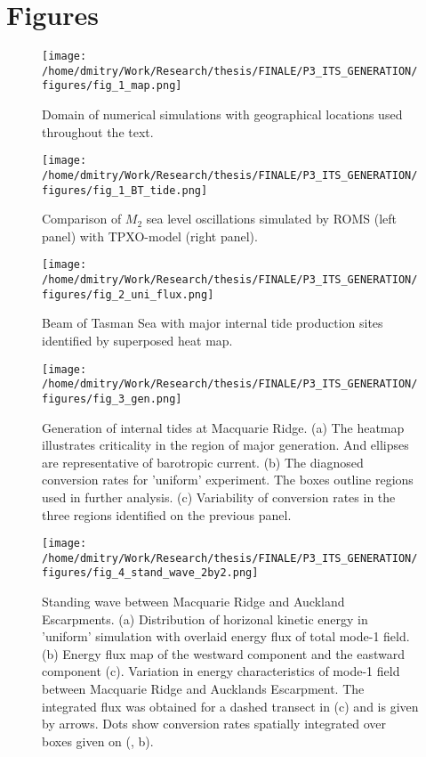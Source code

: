 \documentclass[12pt]{article}
\begin{document}
\newpage
\section{Figures}

\begin{figure}
	\centering
	\texttt{[image: /home/dmitry/Work/Research/thesis/FINALE/P3\_ITS\_GENERATION/figures/fig\_1\_map.png]}
	\caption{Domain of numerical simulations with geographical locations used throughout the text.}
	\label{C3:fig:geo.map}
\end{figure}

\begin{figure}
	\centering
	\texttt{[image: /home/dmitry/Work/Research/thesis/FINALE/P3\_ITS\_GENERATION/figures/fig\_1\_BT\_tide.png]}
	\caption{Comparison of $M_2$ sea level oscillations simulated by ROMS (left panel) with 
	TPXO-model (right panel).}
	\label{C3.fig:BT}
\end{figure}

\begin{figure}
	\centering
	\texttt{[image: /home/dmitry/Work/Research/thesis/FINALE/P3\_ITS\_GENERATION/figures/fig\_2\_uni\_flux.png]}
	\caption{Beam of Tasman Sea with major internal tide production sites identified by superposed 
	heat map.}
	\label{C3.fig:beam}
\end{figure}

\begin{figure}
	\centering
	\texttt{[image: /home/dmitry/Work/Research/thesis/FINALE/P3\_ITS\_GENERATION/figures/fig\_3\_gen.png]}
	\caption{Generation of internal tides at Macquarie Ridge. (a) The heatmap illustrates 
	criticality in the region of major generation. And ellipses are representative of barotropic 
	current. (b) The diagnosed conversion rates for 'uniform' experiment. The boxes outline regions 
	used in further analysis. (c) Variability of conversion rates in the three regions identified 
	on the previous panel.}
	\label{C3.fig:gen}
\end{figure}

\begin{figure}
	\centering
	\texttt{[image: /home/dmitry/Work/Research/thesis/FINALE/P3\_ITS\_GENERATION/figures/fig\_4\_stand\_wave\_2by2.png]}
	\caption{Standing wave between Macquarie Ridge and Auckland Escarpments. (a) Distribution of 
	horizonal kinetic energy in 'uniform' simulation with overlaid energy flux of total mode-1 
	field. (b) Energy flux map of the westward component and the eastward component (c). Variation 
	in energy characteristics of mode-1 field between Macquarie Ridge and Aucklands Escarpment. The 
	integrated flux was obtained for a 	dashed transect in (c) and is given by arrows. Dots show 
	conversion rates spatially integrated over boxes given on (, b).}
	\label{C3.fig:stand_wave}
\end{figure}
\end{document}
